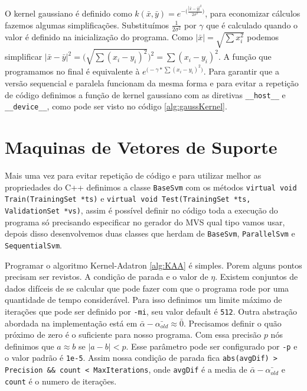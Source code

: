 O kernel gaussiano é definido como $k(\bar{x},\bar{y})=e^{-\big(\frac{|\bar{x}-\bar{y}|^2}{2\sigma^2}\big)}$, para economizar cálculos fazemos algumas simplificações. Substituímos $\frac{1}{2\sigma^2}$ por $\gamma$ que é calculado quando o valor é definido na inicialização do programa. Como $|\bar{x}| = \sqrt{\sum x_i^2}$ podemos simplificar $|\bar{x}-\bar{y}|^2 = \bigg(\sqrt{\sum (x_i-y_i)^2}\bigg)^2=\sum (x_i-y_i)^2$. A função que programamos no final é equivalente à $e^{\big(-\gamma*\sum (x_i-y_i)^2\big)}$.
Para garantir que a versão sequencial e paralela funcionam da mesma forma e para evitar a repetição de código definimos a função de kernel gaussiano com as diretivas \texttt{\_\_host\_\_} e \texttt{\_\_device\_\_}, como pode ser visto no código \ref{alg:gaussKernel}.


\section{Maquinas de Vetores de Suporte}
Mais uma vez para evitar repetição de código e para utilizar melhor as propriedades do C++ definimos a classe \texttt{BaseSvm} com os métodos \texttt{virtual void Train(TrainingSet *ts)} e \texttt{virtual void Test(TrainingSet *ts, ValidationSet *vs)}, assim é possível definir no código toda a execução do programa só precisando especificar no gerador do MVS qual tipo vamos usar, depois disso desenvolvemos duas classes que herdam de \texttt{BaseSvm}, \texttt{ParallelSvm} e \texttt{SequentialSvm}.

Programar o algoritmo Kernel-Adatron \ref{alg:KAA} é simples. Porem alguns pontos precisam ser revistos. A condição de parada e o valor de $\eta$. Existem conjuntos de dados difíceis de se calcular que pode fazer com que o programa rode por uma quantidade de tempo considerável. Para isso definimos um limite máximo de iterações que pode ser definido por \texttt{-mi}, seu valor default é \texttt{512}. Outra abstração abordada na implementação está em $\bar{\alpha}-\bar{\alpha_{old}}\approx \bar{0}$. Precisamos definir o quão próximo de zero é o suficiente para nosso programa. Com essa precisão $p$ nós definimos que $a\approx b$ se $|a-b|<p$. Esse parâmetro pode ser configurado por \texttt{-p} e o valor padrão é \texttt{1e-5}. Assim nossa condição de parada fica \texttt{abs(avgDif) > Precision \&\& count < MaxIterations}, onde \texttt{avgDif} é a media de $\bar{\alpha}-\bar{\alpha_{old}}$ e \texttt{count} é o numero de iterações.

